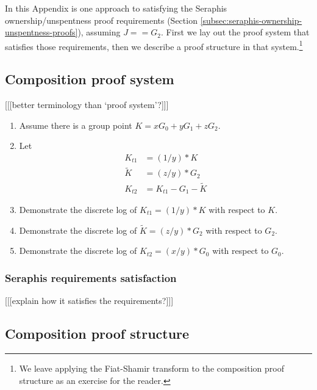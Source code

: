 \begin{appendices}
In this Appendix is one approach to satisfying the Seraphis ownership/unspentness proof requirements (Section \ref{subsec:seraphis-ownership-unspentness-proofs}), assuming $J == G_2$. First we lay out the proof system that satisfies those requirements, then we describe a proof structure in that system.\footnote{We leave applying the Fiat-Shamir transform \cite{fiat-shamir-transform} to the composition proof structure as an exercise for the reader.}


\subsection{Composition proof system}
\label{appendix:composition-proof-system}

[[[better terminology than `proof system'?]]]

\begin{enumerate}
    \item Assume there is a group point $K = x G_0 + y G_1 + z G_2$.

    \item Let
    \begin{align*}
        K_{t1} &= (1/y)*K \\
        \tilde{K} &= (z/y)*G_2 \\
        K_{t2} &= K_{t1} - G_1 - \tilde{K}
    \end{align*}

    \item Demonstrate the discrete log of $K_{t1} = (1/y)*K$ with respect to $K$.

    \item Demonstrate the discrete log of $\tilde{K} = (z/y)*G_2$ with respect to $G_2$.

    \item Demonstrate the discrete log of $K_{t2} = (x/y)*G_0$ with respect to $G_0$.
\end{enumerate}

\subsubsection{Seraphis requirements satisfaction}

[[[explain how it satisfies the requirements?]]]


\subsection{Composition proof structure}
\label{appendix:composition-proof-structure}


\end{appendices}
